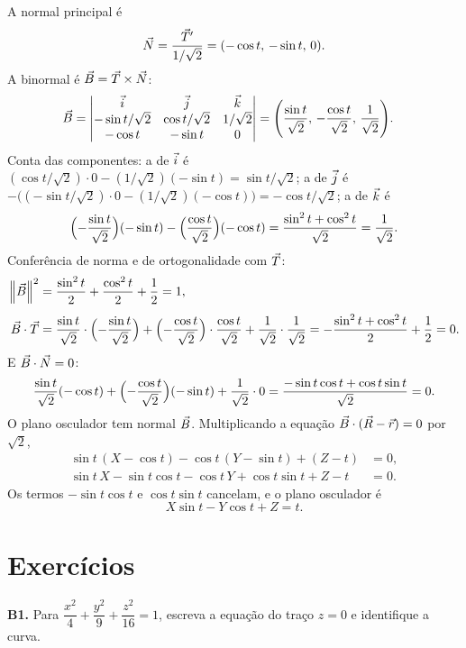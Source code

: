 \documentclass[11pt,a4paper]{article}
\begin{document}
\begin{exemplo}
A normal principal é
\[
\vec{N}
=\frac{\vec{T}'}{1/\sqrt{2}}
=(-\cos t,\,-\sin t,\,0).
\]
A binormal é \(\vec{B}=\vec{T}\times\vec{N}\):
\begin{align*}
\vec{B}
&=
\begin{vmatrix}
\vec{i}&\vec{j}&\vec{k}\\
-\sin t/\sqrt{2}&\cos t/\sqrt{2}&1/\sqrt{2}\\
-\cos t&-\sin t&0
\end{vmatrix}
=\Biggl(\frac{\sin t}{\sqrt{2}},\,-\frac{\cos t}{\sqrt{2}},\,\frac{1}{\sqrt{2}}\Biggr).
\end{align*}
Conta das componentes: a de \(\vec{i}\) é \((\cos t/\sqrt{2})\cdot 0-(1/\sqrt{2})(-\sin t)=\sin t/\sqrt{2}\); a de \(\vec{j}\) é \(-\bigl((-\sin t/\sqrt{2})\cdot 0-(1/\sqrt{2})(-\cos t)\bigr)=-\cos t/\sqrt{2}\); a de \(\vec{k}\) é
\[
\Bigl(-\frac{\sin t}{\sqrt{2}}\Bigr)(-\sin t)-\Bigl(\frac{\cos t}{\sqrt{2}}\Bigr)(-\cos t)
=\frac{\sin^{2}t+\cos^{2}t}{\sqrt{2}}
=\frac{1}{\sqrt{2}}.
\]
Conferência de norma e de ortogonalidade com \(\vec{T}\):
\begin{align*}
\left\lVert \vec{B} \right\rVert^{2}
&=\frac{\sin^{2}t}{2}+\frac{\cos^{2}t}{2}+\frac{1}{2}=1,\\[0.4em]
\vec{B}\cdot\vec{T}
&=\frac{\sin t}{\sqrt{2}}\cdot\Bigl(-\frac{\sin t}{\sqrt{2}}\Bigr)
+\Bigl(-\frac{\cos t}{\sqrt{2}}\Bigr)\cdot\frac{\cos t}{\sqrt{2}}
+\frac{1}{\sqrt{2}}\cdot\frac{1}{\sqrt{2}}
=-\frac{\sin^{2}t+\cos^{2}t}{2}+\frac12
=0.
\end{align*}
E \(\vec{B}\cdot\vec{N}=0\):
\[
\frac{\sin t}{\sqrt{2}}(-\cos t)
+\Bigl(-\frac{\cos t}{\sqrt{2}}\Bigr)(-\sin t)
+\frac{1}{\sqrt{2}}\cdot 0
=\frac{-\sin t\cos t+\cos t\sin t}{\sqrt{2}}
=0.
\]
O plano osculador tem normal \(\vec{B}\). Multiplicando a equação \(\vec{B}\cdot(\vec{R}-\vec{r})=0\) por \(\sqrt{2}\),
\begin{align*}
\sin t\,(X-\cos t)-\cos t\,(Y-\sin t)+(Z-t)&=0,\\
\sin t\, X-\sin t\cos t-\cos t\, Y+\cos t\sin t+Z-t&=0.
\end{align*}
Os termos \(-\sin t\cos t\) e \(\cos t\sin t\) cancelam, e o plano osculador é
\[
X\sin t-Y\cos t+Z=t.
\]
\end{exemplo}

\section{Exercícios}

\begin{exercicio}
\textbf{B1.} Para \(\dfrac{x^{2}}{4}+\dfrac{y^{2}}{9}+\dfrac{z^{2}}{16}=1\), escreva a equação do traço \(z=0\) e identifique a curva.
\end{exercicio}
\end{document}
